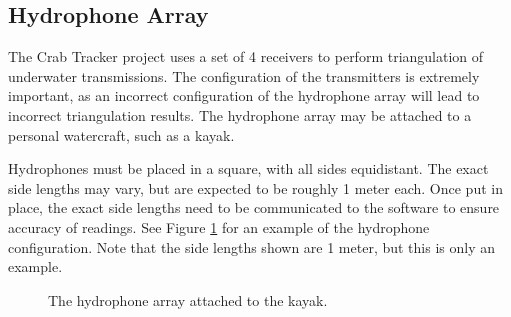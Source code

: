 \documentclass[12pt]{article}
\begin{document}
\subsection{Hydrophone Array}

The Crab Tracker project uses a set of 4 receivers to perform triangulation
of underwater transmissions.
The configuration of the transmitters is extremely important, as an incorrect
configuration of the hydrophone array will lead to incorrect triangulation
results.
The hydrophone array may be attached to a personal watercraft, such as a kayak.

Hydrophones must be placed in a square, with all sides equidistant.
The exact side lengths may vary, but are expected to be roughly 1 meter
each.
Once put in place, the exact side lengths need to be communicated to the
software to ensure accuracy of readings.
See Figure \ref{fig:array} for an example of the hydrophone configuration.
Note that the side lengths shown are 1 meter, but this is only an example.

\begin{figure}[h]
\begin{center}
\end{center}
\caption{The hydrophone array attached to the kayak.}
\label{fig:array}
\end{figure}
\end{document}
